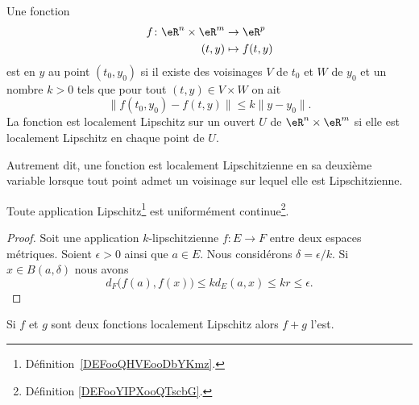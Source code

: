 \begin{definition}      \label{DefJSFFooEOCogV}
	Une fonction
	\begin{equation}
		\begin{aligned}
			f\colon \eR^n\times \eR^m & \to \eR^p      \\
			(t,y)                     & \mapsto f(t,y)
		\end{aligned}
	\end{equation}
	est  en \( y\) au point \( (t_0,y_0)\) si il existe des voisinages \( V\) de \( t_0\) et \( W\) de \( y_0\) et un nombre \( k>0\) tels que pour tout \( (t,y)\in V\times W\) on ait
	\begin{equation}
		\big\| f(t_0,y_0)-f(t,y) \big\|\leq k\| y-y_0 \|.
	\end{equation}
	La fonction est localement Lipschitz sur un ouvert \( U\) de \( \eR^n\times \eR^m\) si elle est localement Lipschitz en chaque point de \( U\).
\end{definition}

\begin{normaltext}      \label{NORMooYNRAooBgobcK}
	Autrement dit, une fonction est localement Lipschitzienne en sa deuxième variable lorsque tout point admet un voisinage sur lequel elle est Lipschitzienne.
\end{normaltext}

\begin{proposition} \label{PROPooVZSAooUneOQK}
    Toute application Lipschitz\footnote{Définition~\ref{DEFooQHVEooDbYKmz}.} est uniformément continue\footnote{Définition \ref{DEFooYIPXooQTscbG}.}.
\end{proposition}

\begin{proof}
    Soit une application \( k\)-lipschitzienne \( f\colon E\to F\) entre deux espaces métriques. Soient \( \epsilon>0\) ainsi que \( a\in E\). Nous considérons \( \delta=\epsilon/k\). Si \( x\in B(a,\delta)\) nous avons
    \begin{equation}
        d_F\big( f(a),f(x) \big)\leq kd_E(a,x)\leq kr\leq \epsilon.
    \end{equation}
\end{proof}

\begin{proposition}     \label{PropGIBZooVsIqfY}
	Si \( f\) et \( g\) sont deux fonctions localement Lipschitz alors \( f+g\) l'est.
\end{proposition}

